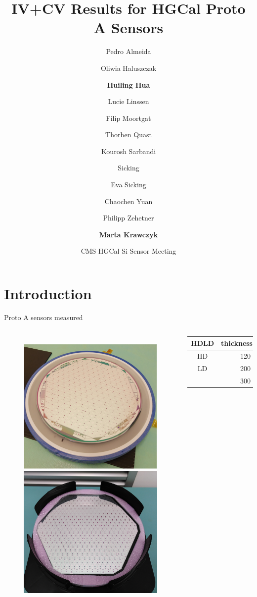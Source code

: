 \documentclass{beamer}
\title[huilng.hua@cern.ch] %
{IV+CV Results for HGCal Proto A Sensors}
\author[Huiling Hua] %
{ Pedro Almeida\and Oliwia Haluszczak\and \textbf{Huiling Hua} \and Lucie Linssen\and Filip Moortgat\and Thorben Quast\and Kourosh Sarbandi\and Sicking\and Eva Sicking\and
Chaochen Yuan\and Philipp Zehetner\and \textbf{Marta Krawczyk} }
\date[2022.02.10] %
{CMS HGCal Si Sensor Meeting}
\begin{document}
\begin{frame}
  \titlepage
\end{frame}

\section{Introduction}
\begin{frame}{Proto A sensors measured}
    \begin{columns}
        \begin{figure}
            \includegraphics[width=.5\textwidth]{plots/LDsensors.png}\\
            \includegraphics[width=.5\textwidth]{plots/HDsensors.png}
        \end{figure}

        \begin{tabular}{|c| c| c|}
            \hline
            HD\/LD & thickness(um)  & number\\
            \hline 
            HD     & 120            & 19    \\
            \hline 
            LD     & 200            & 12     \\
                   & 300            & 30     \\
            \hline
        \end{tabular}




\end{columns}
\end{frame}
\end{document}
